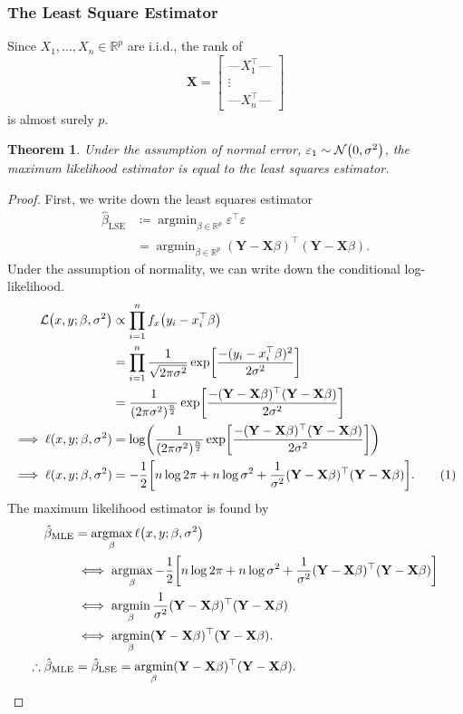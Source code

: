 \documentclass[letterpaper, reqno]{amsart}
\newtheorem{theorem}{Theorem}[section]
\numberwithin{equation}{section}
\newcommand{\numberthis}{\addtocounter{equation}{1}\tag{\theequation}}
\newcommand{\T}{\top} %
\newcommand{\vect}[1]{\boldsymbol{\mathbf{#1}}} %
\newcommand{\Li}[1]{\mathcal{L}\mleft( #1 \mright)}  %
\newcommand{\R}{\mathbb{R}}  %
\newcommand{\N}[2]{\mathcal{N}\mleft( #1, #2 \mright)}
\newcommand{\iid}{i.i.d.}
\newcommand{\Xm}{\vect{X}}
\newcommand{\Yv}{\vect{Y}}
\newcommand{\Bv}{\beta}
\newcommand{\Bvh}{\hat{\beta}}
\newcommand{\ve}{\varepsilon}
\DeclareMathOperator*{\argmin}{argmin}
\DeclareMathOperator*{\argmax}{argmax}
\begin{document}
\subsubsection{The Least Square Estimator}
Since $X_1, \dots, X_n \in \R^p$ are \iid, the rank of
\[ \Xm = \begin{bmatrix} 
            \text{---} X_1^\T \text{---} \\
            \vdots \\ 
            \text{---} X_n^\T \text{---} 
          \end{bmatrix} 
\]
is almost surely $p$.

\begin{theorem}
  Under the assumption of normal error, $\ve_1 \sim \N{0}{\sigma^2}$, the maximum
  likelihood estimator is equal to the least squares estimator.
\end{theorem}

\begin{proof}
  First, we write down the least squares estimator
  \begin{align*}
    \Bvh_\mathrm{LSE} &\coloneqq \argmin_{\Bv \in \R^p} \ve^\T \ve \\
                      &= \argmin_{\Bv \in \R^p} (\Yv - \Xm\Bv)^\T (\Yv - \Xm\Bv).
  \end{align*}
  Under the assumption of normality, we can write down the conditional log-likelihood.
  \begin{align*}
    \Li{x, y; \Bv, \sigma^2} &\propto \prod_{i=1}^n f_x\mleft(y_i - x_i^\T\Bv\mright) \\
    &= \prod_{i=1}^n \frac{1}{\sqrt{2\pi\sigma^2}} 
       \exp \mleft[\frac{-(y_i - x_i^\T\Bv)^2}{2\sigma^2}\mright] \\
    &= \frac{1}{(2\pi\sigma^2)^\frac{n}{2}} 
       \exp \mleft[\frac{-(\Yv - \Xm\Bv)^\T(\Yv - \Xm\Bv)}{2\sigma^2}\mright] \\
    \implies \ell(x, y; \Bv, \sigma^2) &= \log\mleft( \frac{1}{(2\pi\sigma^2)^\frac{n}{2}} 
       \exp \mleft[\frac{-(\Yv - \Xm\Bv)^\T(\Yv - \Xm\Bv)}{2\sigma^2}\mright]
       \mright) \\
    \implies \ell(x, y; \Bv, \sigma^2) &= -\frac{1}{2}\mleft[ n\log 2\pi + n \log\sigma^2 
          + \frac{1}{\sigma^2} (\Yv - \Xm\Bv)^\T(\Yv - \Xm\Bv) \mright]. \numberthis \label{eq:likelihood}
  \end{align*}
  The maximum likelihood estimator is found by
  \begin{align*}
    \Bvh_\mathrm{MLE} &= \argmax_\Bv \ell\mleft(x, y; \Bv, \sigma^2\mright) \\
    &\iff \argmax_\Bv -\frac{1}{2}\mleft[ n\log 2\pi + n\log\sigma^2 
          + \frac{1}{\sigma^2} (\Yv - \Xm\Bv)^\T(\Yv - \Xm\Bv) \mright] \\
    &\iff \argmin_\Bv \frac{1}{\sigma^2} (\Yv - \Xm\Bv)^\T(\Yv - \Xm\Bv) \\
    &\iff \argmin_\Bv (\Yv - \Xm\Bv)^\T(\Yv - \Xm\Bv). \\
    \therefore \Bvh_\mathrm{MLE} &= \Bvh_\mathrm{LSE} = \argmin_\Bv (\Yv - \Xm\Bv)^\T(\Yv - \Xm\Bv). \qedhere
  \end{align*}
\end{proof}
\end{document}

